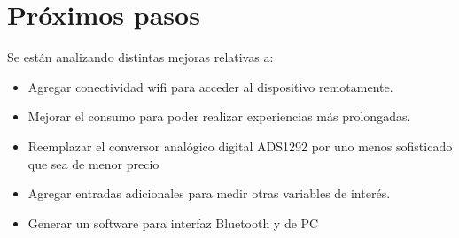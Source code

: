 \section{Próximos pasos}

Se están analizando distintas mejoras relativas a:

\begin{itemize}

\item Agregar conectividad wifi para acceder al dispositivo remotamente.

\item Mejorar el consumo para poder realizar experiencias más prolongadas.

\item Reemplazar el conversor analógico digital ADS1292 por uno menos sofisticado que sea de menor precio

\item Agregar entradas adicionales para medir otras variables de interés.

\item Generar un software para interfaz Bluetooth y de PC

\end{itemize}